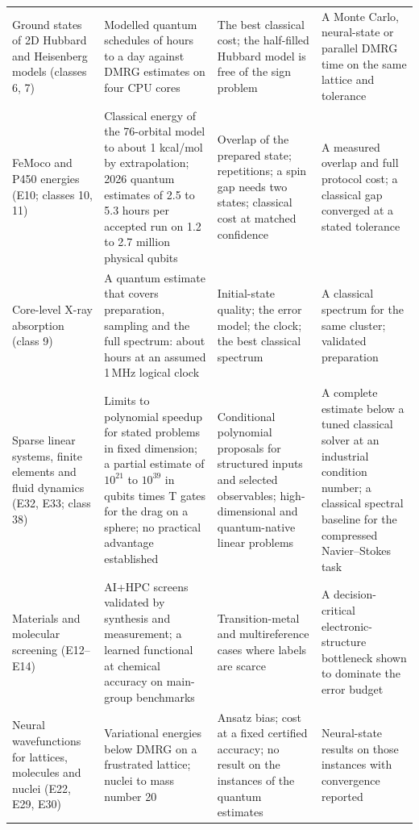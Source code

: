\documentclass[10pt,a4paper]{article}
\begin{document}
{\begin{longtable}{@{}L{3.0cm} L{4.7cm} L{4.1cm} L{4.1cm}@{}}
Ground states of 2D Hubbard and Heisenberg models (classes 6, 7) & Modelled quantum schedules of hours to a day against DMRG estimates on four CPU cores & The best classical cost; the half-filled Hubbard model is free of the sign problem & A Monte Carlo, neural-state or parallel DMRG time on the same lattice and tolerance\\
FeMoco and P450 energies (E10; classes 10, 11) & Classical energy of the 76-orbital model to about 1 kcal/mol by extrapolation; 2026 quantum estimates of 2.5 to 5.3 hours per accepted run on 1.2 to 2.7 million physical qubits & Overlap of the prepared state; repetitions; a spin gap needs two states; classical cost at matched confidence & A measured overlap and full protocol cost; a classical gap converged at a stated tolerance\\
Core-level X-ray absorption (class 9) & A quantum estimate that covers preparation, sampling and the full spectrum: about \xasHours{} hours at an assumed 1\,MHz logical clock & Initial-state quality; the error model; the clock; the best classical spectrum & A classical spectrum for the same cluster; validated preparation\\
Sparse linear systems, finite elements and fluid dynamics (E32, E33; class 38) & Limits to polynomial speedup for stated problems in fixed dimension; a partial estimate of $10^{21}$ to $10^{39}$ in qubits times T gates for the drag on a sphere; no practical advantage established & Conditional polynomial proposals for structured inputs and selected observables; high-dimensional and quantum-native linear problems & A complete estimate below a tuned classical solver at an industrial condition number; a classical spectral baseline for the compressed Navier--Stokes task\\
Materials and molecular screening (E12--E14) & AI+HPC screens validated by synthesis and measurement; a learned functional at chemical accuracy on main-group benchmarks & Transition-metal and multireference cases where labels are scarce & A decision-critical electronic-structure bottleneck shown to dominate the error budget\\
Neural wavefunctions for lattices, molecules and nuclei (E22, E29, E30) & Variational energies below DMRG on a frustrated lattice; nuclei to mass number 20 & Ansatz bias; cost at a fixed certified accuracy; no result on the instances of the quantum estimates & Neural-state results on those instances with convergence reported\\
\end{longtable}
}
\end{document}
